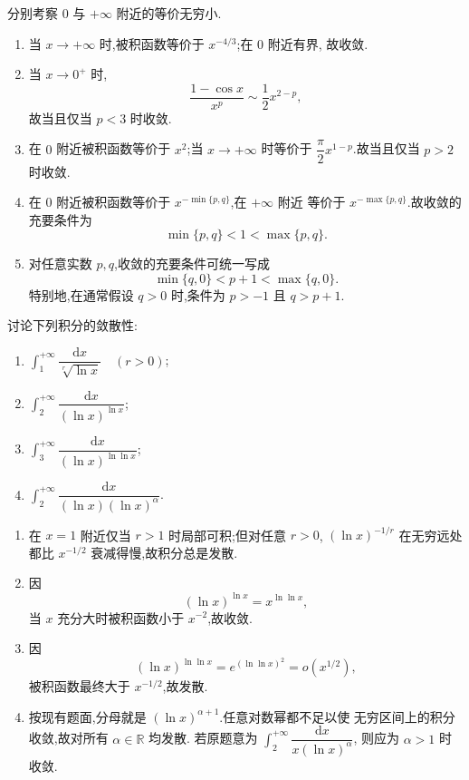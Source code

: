\begin{solution}
  分别考察 $0$ 与 $+\infty$ 附近的等价无穷小.
  \begin{enumerate}
    \item 当 $x\to+\infty$ 时,被积函数等价于 $x^{-4/3}$;在 $0$ 附近有界,
          故收敛.
    \item 当 $x\to0^+$ 时,
          \[
            \dfrac{1-\cos x}{x^p}\sim\dfrac{1}{2}x^{2-p},
          \]
          故当且仅当 $p<3$ 时收敛.
    \item 在 $0$ 附近被积函数等价于 $x^2$;当 $x\to+\infty$ 时等价于
          $\dfrac{\pi}{2}x^{1-p}$.故当且仅当 $p>2$ 时收敛.
    \item 在 $0$ 附近被积函数等价于 $x^{-\min\{p,q\}}$,在 $+\infty$ 附近
          等价于 $x^{-\max\{p,q\}}$.故收敛的充要条件为
          \[
            \min\{p,q\}<1<\max\{p,q\}.
          \]
    \item 对任意实数 $p,q$,收敛的充要条件可统一写成
          \[
            \min\{q,0\}<p+1<\max\{q,0\}.
          \]
          特别地,在通常假设 $q>0$ 时,条件为 $p>-1$ 且 $q>p+1$.
  \end{enumerate}
\end{solution}

\begin{example}
  讨论下列积分的敛散性:
  \begin{enumerate}
    \item $\displaystyle\int_1^{+\infty}\dfrac{\mathrm{d}x}{\sqrt[r]{\ln x}}\quad(r>0)$;
    \item $\displaystyle\int_2^{+\infty}\dfrac{\mathrm{d}x}{(\ln x)^{\ln x}}$;
    \item $\displaystyle\int_3^{+\infty}\dfrac{\mathrm{d}x}{(\ln x)^{\ln\ln x}}$;
    \item $\displaystyle\int_2^{+\infty}\dfrac{\mathrm{d}x}{(\ln x)(\ln x)^\alpha}$.
  \end{enumerate}
\end{example}
\exampleblank

\begin{solution}
  \begin{enumerate}
    \item 在 $x=1$ 附近仅当 $r>1$ 时局部可积;但对任意 $r>0$,
          $(\ln x)^{-1/r}$ 在无穷远处都比 $x^{-1/2}$ 衰减得慢,故积分总是发散.
    \item 因
          \[
            (\ln x)^{\ln x}=x^{\ln\ln x},
          \]
          当 $x$ 充分大时被积函数小于 $x^{-2}$,故收敛.
    \item 因
          \[
            (\ln x)^{\ln\ln x}=e^{(\ln\ln x)^2}=o(x^{1/2}),
          \]
          被积函数最终大于 $x^{-1/2}$,故发散.
    \item 按现有题面,分母就是 $(\ln x)^{\alpha+1}$.任意对数幂都不足以使
          无穷区间上的积分收敛,故对所有 $\alpha\in\mathbb{R}$ 均发散.
          若原题意为 $\displaystyle\int_2^{+\infty}\dfrac{\mathrm{d}x}{x(\ln x)^\alpha}$,
          则应为 $\alpha>1$ 时收敛.
  \end{enumerate}
\end{solution}

